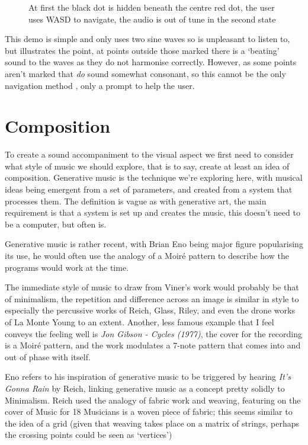 \begin{figure}[H]
\centering
{}%
\hspace*{2cm}%
\caption{At first the black dot is hidden beneath the centre red dot, the user uses WASD to navigate,
the audio is out of tune in the second state}
\end{figure}
This demo is simple and only uses two sine waves so is unpleasant to listen to,
but illustrates the point, at points outside those marked there is a `beating'
sound to the waves as they do not harmonise correctly. However, as some points
aren't marked that \emph{do} sound somewhat consonant, so this cannot be the
only navigation method , only a prompt to help the user.
\section{Composition}
\label{Composition}
To create a sound accompaniment to the visual aspect we first need to consider
what style of music we should explore, that is to say, create at least an idea
of composition. Generative music is the technique we're exploring here, with
musical ideas being emergent from a set of parameters, and created from a system
that processes them. The definition is vague as with generative art, the main
requirement is that a system is set up and creates the music, this doesn't need
to be a computer, but often is.

Generative music is rather recent, with Brian Eno being major figure
popularising its use, he would often use the analogy of a Moir\'{e} pattern to
describe how the programs would work at the time.  

The immediate style of music to draw from Viner's work would probably be that of
minimalism, the repetition and difference across an image is similar in style to
especially the percussive works of Reich, Glass, Riley, and even the drone works
of La Monte Young to an extent. Another, less famous example that I feel conveys
the feeling well is \emph{Jon Gibson - Cycles (1977)}, the cover for the
recording is a Moir\'{e} pattern, and the work modulates a 7-note pattern that
comes into and out of phase with itself.

Eno refers to his inspiration of generative music to be triggered by
hearing \emph{It's Gonna Rain} by Reich, linking generative music as a concept
pretty solidly to Minimalism. Reich used the analogy of fabric work and weaving,
featuring on the cover of Music for 18 Musicians is a woven piece of fabric;
this seems similar to the idea of a grid (given that weaving takes place on a
matrix of strings, perhaps the crossing points could be seen as `vertices')

